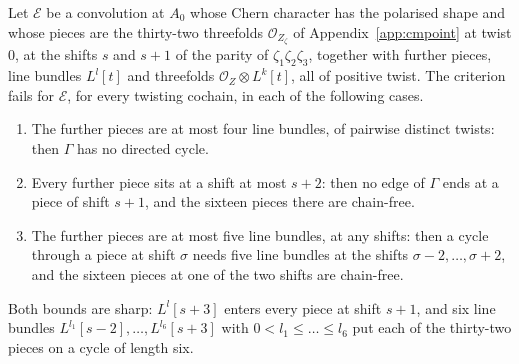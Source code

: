 \begin{corollary}\label{cor:chainfree}
Let $\mathcal{E}$ be a convolution at $A_{0}$ whose Chern character has the polarised shape and whose pieces are the thirty-two threefolds $\mathcal{O}_{Z_{\zeta}}$ of Appendix~\ref{app:cmpoint} at twist $0$, at the shifts $s$ and $s+1$ of the parity of $\zeta_{1}\zeta_{2}\zeta_{3}$, together with further pieces, line bundles $L^{l}[t]$ and threefolds $\mathcal{O}_{Z}\otimes L^{k}[t]$, all of positive twist. The criterion fails for $\mathcal{E}$, for every twisting cochain, in each of the following cases.
\begin{enumerate}[label=\textup{(\roman*)},leftmargin=2.4em,itemsep=2pt]
\item The further pieces are at most four line bundles, of pairwise distinct twists: then $\Gamma$ has no directed cycle.
\item Every further piece sits at a shift at most $s+2$: then no edge of $\Gamma$ ends at a piece of shift $s+1$, and the sixteen pieces there are chain-free.
\item The further pieces are at most five line bundles, at any shifts: then a cycle through a piece at shift $\sigma$ needs five line bundles at the shifts $\sigma-2,\dots,\sigma+2$, and the sixteen pieces at one of the two shifts are chain-free.
\end{enumerate}
Both bounds are sharp: $L^{l}[s+3]$ enters every piece at shift $s+1$, and six line bundles $L^{l_{1}}[s-2],\dots,L^{l_{6}}[s+3]$ with $0<l_{1}\le\dots\le l_{6}$ put each of the thirty-two pieces on a cycle of length six.
\end{corollary}

